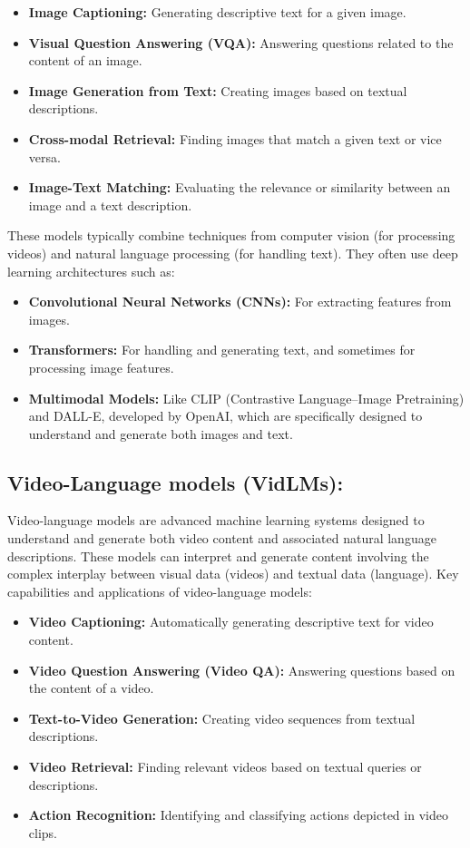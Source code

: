 \begin{itemize}
\item \textbf{Image Captioning:} Generating descriptive text for a given image.
\item \textbf{Visual Question Answering (VQA):} Answering questions related to the content of an image.
\item \textbf{Image Generation from Text:} Creating images based on textual descriptions.
\item \textbf{Cross-modal Retrieval:} Finding images that match a given text or vice versa.
\item \textbf{Image-Text Matching:} Evaluating the relevance or similarity between an image and a text description.
\end{itemize}

These models typically combine techniques from computer vision (for processing videos) and natural language processing (for handling text). They often use deep learning architectures such as:

\begin{itemize}
\item \textbf{Convolutional Neural Networks (CNNs):} For extracting features from images.
\item \textbf{Transformers:} For handling and generating text, and sometimes for processing image features.
\item \textbf{Multimodal Models:} Like CLIP (Contrastive Language–Image Pretraining) and DALL-E, developed by OpenAI, which are specifically designed to understand and generate both images and text.
\end{itemize}
\subsection{Video-Language models (VidLMs):} \label{vlm}
Video-language models are advanced machine learning systems designed to understand and generate both video content and associated natural language descriptions. These models can interpret and generate content involving the complex interplay between visual data (videos) and textual data (language). Key capabilities and applications of video-language models:

\begin{itemize}
\item \textbf{Video Captioning:} Automatically generating descriptive text for video content.
\item \textbf{Video Question Answering (Video QA):} Answering questions based on the content of a video.
\item \textbf{Text-to-Video Generation:} Creating video sequences from textual descriptions.
\item \textbf{Video Retrieval:} Finding relevant videos based on textual queries or descriptions.
\item \textbf{Action Recognition:} Identifying and classifying actions depicted in video clips.
\end{itemize}

